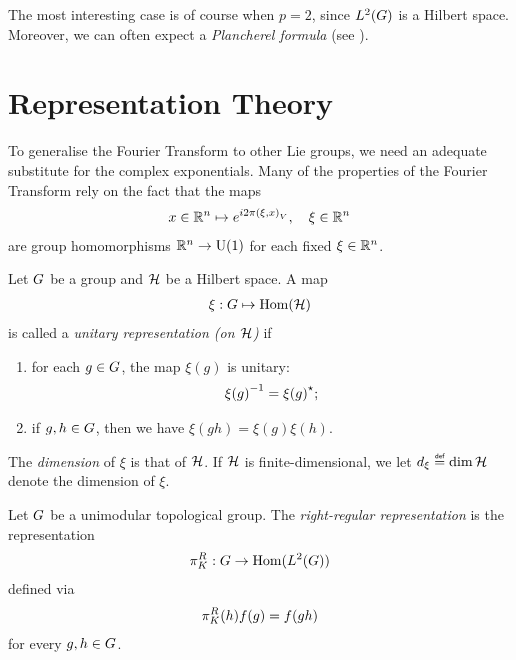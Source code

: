 The most interesting case is of course when $p = 2$,
since ${L^{2} (G)}$ is a Hilbert space.
Moreover,
we can often expect a \emph{Plancherel formula}
(see \cite[Subsection 1.8.2]{FischerRuzhansky16}).

\section{Representation Theory}

To generalise the Fourier Transform to other Lie groups,
we need an adequate substitute for the complex exponentials.
Many of the properties of the Fourier Transform rely on the fact that the maps
\begin{align*}
    x \in \mathbb{R}^n \mapsto e^{i 2 \pi {\left(\xi, x\right)_{V}}},
    \quad \xi \in \mathbb{R}^n
\end{align*}
are group homomorphisms $\mathbb{R}^n \to {\mathrm{U} (1)}$ for each fixed $\xi \in \mathbb{R}^n$.

\begin{definition}
\label{definition:unitary_representation}
    Let $G$ be a group and $\mathcal{H}$ be a Hilbert space.
    A map
    \begin{align*}
        \xi : G \mapsto \operatorname{Hom}(\mathcal{H})
    \end{align*}
    is called a \emph{unitary representation (on $\mathcal{H}$)} if
    \begin{enumerate}
        \item for each $g \in G$, the map $\xi(g)$ is unitary:
            \begin{align*}
                {\xi(g)}^{-1} = {\xi(g)}^\star;
            \end{align*}
        \item if $g, h \in G$, then we have $\xi(g h) = \xi(g) \xi(h)$.
    \end{enumerate}

    The \emph{dimension} of $\xi$ is that of $\mathcal{H}$.
    If $\mathcal{H}$ is finite-dimensional,
    we let $\dimRep{\xi} \defeq \dim{\Hil}$ denote the dimension of $\xi$.
\end{definition}

\begin{example}
    Let $G$ be a unimodular topological group.
    The \emph{right-regular representation} is the representation
    \begin{align*}
        \pi^R_{K} : G \to \operatorname{Hom}({L^{2} (G)})
    \end{align*}
    defined via
    \begin{align*}
        \pi^R_{K}(h) f(g) = f(g h)
    \end{align*}
    for every $g, h \in G$.
\end{example}

